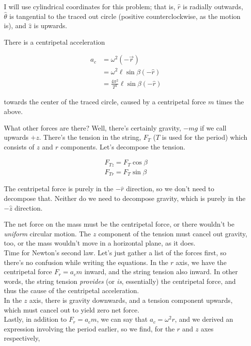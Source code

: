 \documentclass[8.01x]{subfiles}
\begin{document}
I will use cylindrical coordinates for this problem; that is, $\hat{r}$ is radially outwards, $\hat{\theta}$ is tangential to the traced out circle (positive counterclockwise, as the motion is), and $\hat{z}$ is upwards.

There is a centripetal acceleration 

\begin{align}
a_c &= \omega^2 (-\vec{r})\\
      &= \omega^2 \ell \sin \beta (-\hat{r})\\
      &= \frac{4 \pi^2}{T^2} \ell \sin \beta (-\hat{r})
\end{align}

towards the center of the traced circle, caused by a centripetal force $m$ times the above.

What other forces are there? Well, there's certainly gravity, $-m g$ if we call upwards $+z$. There's the tension in the string, $F_T$ ($T$ is used for the period) which consists of $z$ and $r$ components. Let's decompose the tension.

\begin{align}
F_{Tz} = F_T \cos \beta\\
F_{Tr} = F_T \sin \beta
\end{align}

The centripetal force is purely in the $-\hat{r}$ direction, so we don't need to decompose that. Neither do we need to decompose gravity, which is purely in the $-\hat{z}$ direction.

The net force on the mass must be the centripetal force, or there wouldn't be \emph{uniform} circular motion. The $z$ component of the tension must cancel out gravity, too, or the mass wouldn't move in a horizontal plane, as it does.\\
Time for Newton's second law. Let's just gather a list of the forces first, so there's no confusion while writing the equations. In the $r$ axis, we have the centripetal force $F_r = a_c m$ inward, and the string tension also inward. In other words, the string tension \emph{provides} (or \emph{is}, essentially) the centripetal force, and thus the cause of the centripetal acceleration.\\
In the $z$ axis, there is gravity downwards, and a tension component upwards, which must cancel out to yield zero net force.\\
Lastly, in addition to $F_r = a_c m$, we can say that $a_c = \omega^2 r$, and we derived an expression involving the period earlier, so we find, for the $r$ and $z$ axes respectively,
\end{document}
